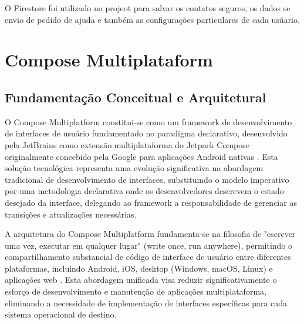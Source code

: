 O Firestore foi utilizado no projeot para salvar os contatos seguros, os dados se envio de pedido de ajuda e também as configurações particulares de cada usúario. 
\begin{comment}
O Firestore foi arquitetado para proporcionar escalabilidade horizontal automática, adaptando-se dinamicamente ao volume de dados e quantidade de operações sem intervenção manual dos desenvolvedores \cite{google2023scalability}. Esta característica é particularmente relevante para aplicações com padrões de uso imprevisíveis ou crescimento exponencial de usuários, onde a capacidade de processamento deve ajustar-se automaticamente à demanda.

O modelo de precificação adotado segue uma estrutura pay-per-operation, onde os custos são calculados com base no número de operações de leitura, escrita e exclusão realizadas, complementado por tarifas de armazenamento e transferência de dados \cite{firebase2023pricing}. Esta abordagem granular de cobrança permite otimização de custos através do design eficiente de consultas e estratégias de cache, tornando-se economicamente viável tanto para projetos em escala reduzida quanto para aplicações empresariais de grande porte.

\end{comment}
\section{Compose Multiplataform}
\subsection{Fundamentação Conceitual e Arquitetural}

O Compose Multiplatform constitui-se como um framework de desenvolvimento de interfaces de usuário fundamentado no paradigma declarativo, desenvolvido pela JetBrains como extensão multiplataforma do Jetpack Compose originalmente concebido pela Google para aplicações Android nativas \cite{jetbrains2023compose}. Esta solução tecnológica representa uma evolução significativa na abordagem tradicional de desenvolvimento de interfaces, substituindo o modelo imperativo por uma metodologia declarativa onde os desenvolvedores descrevem o estado desejado da interface, delegando ao framework a responsabilidade de gerenciar as transições e atualizações necessárias.

A arquitetura do Compose Multiplatform fundamenta-se na filosofia de "escrever uma vez, executar em qualquer lugar" (write once, run anywhere), permitindo o compartilhamento substancial de código de interface de usuário entre diferentes plataformas, incluindo Android, iOS, desktop (Windows, macOS, Linux) e aplicações web \cite{kotlin2023multiplatform}. Esta abordagem unificada visa reduzir significativamente o esforço de desenvolvimento e manutenção de aplicações multiplataforma, eliminando a necessidade de implementação de interfaces específicas para cada sistema operacional de destino.


